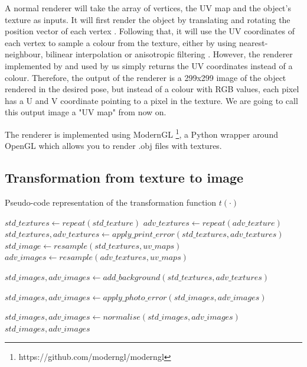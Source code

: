 A normal renderer will take the array of vertices, the UV map and the object's texture as inputs. It will first render the object by translating and rotating the position vector of each vertex \cite{opengl_shaders}. Following that, it will use the UV coordinates of each vertex to sample a colour from the texture, either by using nearest-neighbour, bilinear interpolation or anisotropic filtering \cite{opengl_textures}. However, the renderer implemented by \cite{ring_adversarial_3d} and used by us simply returns the UV coordinates instead of a colour. Therefore, the output of the renderer is a 299x299 image of the object rendered in the desired pose, but instead of a colour with RGB values, each pixel has a U and V coordinate pointing to a pixel in the texture. We are going to call this output image a "UV map" from now on.

The renderer is implemented using ModernGL \footnote{https://github.com/moderngl/moderngl}, a Python wrapper around OpenGL which allows you to render .obj files with textures.

\subsection{Transformation from texture to image}
    \label{subsec:eot_transformation}
    
\begin{algorithm}
\caption{Pseudo-code representation of the transformation function $t(\cdot)$}
\label{alg:rendering}
\begin{algorithmic}[1]
\STATE $std\_textures \gets repeat(std\_texture)$
\STATE $adv\_textures \gets repeat(adv\_texture)$
    \STATE $std\_textures, adv\_textures \gets apply\_print\_error(std\_textures, adv\_textures)$
\ENDIF
\STATE $std\_image \gets resample(std\_textures, uv\_maps)$
\STATE $adv\_images \gets resample(adv\_textures, uv\_maps)$

\STATE $std\_images, adv\_images \gets add\_background(std\_textures, adv\_textures)$

    \STATE $std\_images, adv\_images \gets apply\_photo\_error(std\_images, adv\_images)$
\ENDIF

\STATE $std\_images, adv\_images \gets normalise(std\_images, adv\_images)$
\RETURN $std\_images, adv\_images$
\end{algorithmic}
\end{algorithm}


